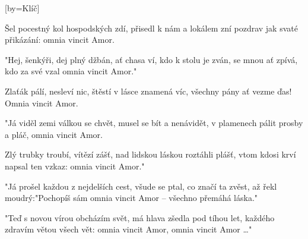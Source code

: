 [by={Klíč}]

\beginverse*{}
             
\endverse{}

\beginverse{}
Šel pocestný kol hospodských zdí,
přisedl k nám a lokálem zní
pozdrav jak svaté přikázání:
omnia vincit Amor.
\endverse{}

\beginverse{}
"Hej, šenkýři, dej plný džbán,
ať chasa ví, kdo k stolu je zván,
se mnou ať zpívá, kdo za své vzal
omnia vincit Amor."
\endverse{}

\beginchorus{}
Zlaťák pálí, nesleví nic,
štěstí v lásce znamená víc,
všechny pány ať vezme ďas!
Omnia vincit Amor.
\endchorus{}

\beginverse{}
"Já viděl zemi válkou se chvět,
musel se bít a nenávidět,
v plamenech pálit prosby a pláč,
omnia vincit Amor.
\endverse{}

\beginverse{}
Zlý trubky troubí, vítězí zášť,
nad lidskou láskou roztáhli plášť,
vtom kdosi krví napsal ten vzkaz:
omnia vincit Amor."
\endverse{}

\beginchorus{}
\phantom{}
\endchorus{}

\beginverse{}
"Já prošel každou z nejdelších cest,
všude se ptal, co značí ta zvěst,
až řekl moudrý:"Pochopíš sám
omnia vincit Amor -- všechno přemáhá láska."
\endverse{}

\beginchorus{}
\phantom{}
\endchorus{}

\beginverse{}
"Teď s novou vírou obcházím svět,
má hlava zšedla pod tíhou let,
každého zdravím větou všech vět:
omnia vincit Amor, omnia vincit Amor \ldots{}"
\endverse{}

\endsong{}
